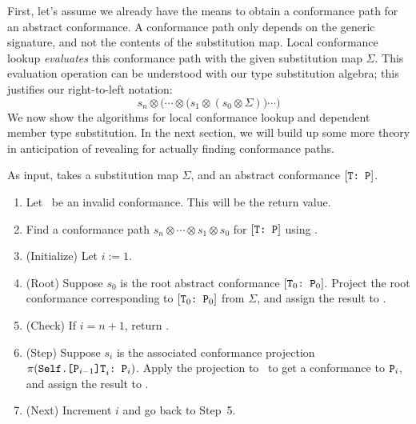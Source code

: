 \documentclass[../generics]{subfiles}
\begin{document}
First, let's assume we already have the means to obtain a conformance path for an abstract conformance. A conformance path only depends on the generic signature, and not the contents of the substitution map. Local conformance lookup \emph{evaluates} this conformance path with the given substitution map $\Sigma$. This evaluation operation can be understood with our type substitution algebra; this justifies our right-to-left notation:
\[s_n\otimes\bigl(\cdots\otimes \bigl(s_1 \otimes (s_0 \otimes \Sigma)\bigr) \cdots \bigr)\]
We now show the algorithms for local conformance lookup and dependent member type substitution. In the next section, we will build up some more theory in anticipation of revealing  for actually finding conformance paths.

\begin{algorithm}\label{local conformance lookup algorithm}
As input, takes a substitution map $\Sigma$, and an abstract conformance $[\texttt{T:~P}]$.
\begin{enumerate}
\item Let \nC\ be an invalid conformance. This will be the return value.
\item Find a conformance path $s_n\otimes \cdots \otimes s_1\otimes s_0$ for $[\texttt{T:~P}]$ using .
\item (Initialize) Let $i := 1$.
\item (Root) Suppose $s_0$ is the root abstract conformance $[\texttt{$\texttt{T}_0$:~$\texttt{P}_0$}]$. Project the root conformance corresponding to $[\texttt{$\texttt{T}_0$:~$\texttt{P}_0$}]$ from $\Sigma$, and assign the result to \nC.
\item (Check) If $i=n+1$, return \nC.
\item (Step) Suppose $s_i$ is the associated conformance projection $\pi(\texttt{$\texttt{Self.[$\texttt{P}_{i-1}$]T}_i$:~$\texttt{P}_i$})$. Apply the projection to \nC\ to get a conformance to $\texttt{P}_i$, and assign the result to \nC.
\item (Next) Increment $i$ and go back to Step~5.
\end{enumerate}
\end{algorithm}
\end{document}
